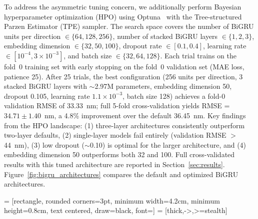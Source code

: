 \documentclass[11pt,a4paper]{article}
\begin{document}
To address the asymmetric tuning concern, we additionally perform Bayesian hyperparameter optimization (HPO) using Optuna~\cite{akiba2019optuna} with the Tree-structured Parzen Estimator (TPE) sampler.
The search space covers the number of BiGRU units per direction $\in \{64, 128, 256\}$, number of stacked BiGRU layers $\in \{1, 2, 3\}$, embedding dimension $\in \{32, 50, 100\}$, dropout rate $\in [0.1, 0.4]$, learning rate $\in [10^{-4}, 3 \times 10^{-3}]$, and batch size $\in \{32, 64, 128\}$.
Each trial trains on the fold~0 training set with early stopping on the fold~0 validation set (MAE loss, patience 25).
After 25 trials, the best configuration (256 units per direction, 3 stacked BiGRU layers with $\sim$2.97M parameters, embedding dimension 50, dropout 0.105, learning rate $1.1 \times 10^{-3}$, batch size 128) achieves a fold-0 validation RMSE of 33.33~nm; full 5-fold cross-validation yields RMSE = $34.71 \pm 1.40$~nm, a 4.8\% improvement over the default 36.45~nm.
Key findings from the HPO landscape: (1) three-layer architectures consistently outperform two-layer defaults, (2) single-layer models fail entirely (validation RMSE $>$44~nm), (3) low dropout ($\sim$0.10) is optimal for the larger architecture, and (4) embedding dimension 50 outperforms both 32 and 100.
Full cross-validated results with this tuned architecture are reported in Section~\ref{sec:results}.
Figure~\ref{fig:bigru_architectures} compares the default and optimized BiGRU architectures.

 = [rectangle, rounded corners=3pt, minimum width=4.2cm, minimum height=0.8cm, text centered, draw=black, font=\small]
 = [thick,->,>=stealth]
\end{document}

